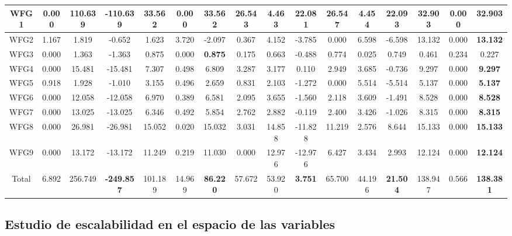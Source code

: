 \begin{table}[H]
{\begin{tabular}{|c|c|c|c|c|c|c|c|c|c|c|c|c|c|c|c|}
WFG1 & 0.000 & 110.639 & -110.639 & 33.562 & 0.000 & \textbf{33.562} & 26.543 & 4.463 & 22.081 & 26.547 & 4.454 & 22.093 & 32.903 & 0.000 & 32.903 \\ \hline
WFG2 & 1.167 & 1.819 & -0.652 & 1.623 & 3.720 & -2.097 & 0.367 & 4.152 & -3.785 & 0.000 & 6.598 & -6.598 & 13.132 & 0.000 & \textbf{13.132} \\ \hline
WFG3 & 0.000 & 1.363 & -1.363 & 0.875 & 0.000 & \textbf{0.875} & 0.175 & 0.663 & -0.488 & 0.774 & 0.025 & 0.749 & 0.461 & 0.234 & 0.227 \\ \hline
WFG4 & 0.000 & 15.481 & -15.481 & 7.307 & 0.498 & 6.809 & 3.287 & 3.177 & 0.110 & 2.949 & 3.685 & -0.736 & 9.297 & 0.000 & \textbf{9.297} \\ \hline
WFG5 & 0.918 & 1.928 & -1.010 & 3.155 & 0.496 & 2.659 & 0.831 & 2.103 & -1.272 & 0.000 & 5.514 & -5.514 & 5.137 & 0.000 & \textbf{5.137} \\ \hline
WFG6 & 0.000 & 12.058 & -12.058 & 6.970 & 0.389 & 6.581 & 2.095 & 3.655 & -1.560 & 2.118 & 3.609 & -1.491 & 8.528 & 0.000 & \textbf{8.528} \\ \hline
WFG7 & 0.000 & 13.025 & -13.025 & 6.346 & 0.492 & 5.854 & 2.762 & 2.882 & -0.119 & 2.400 & 3.426 & -1.026 & 8.315 & 0.000 & \textbf{8.315} \\ \hline
WFG8 & 0.000 & 26.981 & -26.981 & 15.052 & 0.020 & 15.032 & 3.031 & 14.858 & -11.828 & 11.219 & 2.576 & 8.644 & 15.133 & 0.000 & \textbf{15.133} \\ \hline
WFG9 & 0.000 & 13.172 & -13.172 & 11.249 & 0.219 & 11.030 & 0.000 & 12.976 & -12.976 & 6.427 & 3.434 & 2.993 & 12.124 & 0.000 & \textbf{12.124} \\ \hline
Total & 6.892 & 256.749 & \textbf{-249.857} & 101.189 & 14.969 & \textbf{86.220} & 57.672 & 53.920 & \textbf{3.751} & 65.700 & 44.196 & \textbf{21.504} & 138.947 & 0.566 & \textbf{138.381} \\ \hline
\end{tabular}%
}
\end{table}


\subsection{Estudio de escalabilidad en el espacio de las variables}

